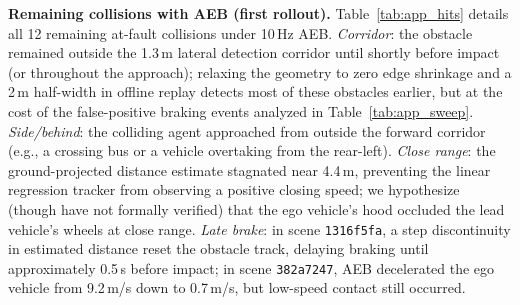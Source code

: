 \textbf{Remaining collisions with AEB (first rollout).} Table~\ref{tab:app_hits} details all 12 remaining at-fault collisions under 10\,Hz AEB. \emph{Corridor}: the obstacle remained outside the 1.3\,m lateral detection corridor until shortly before impact (or throughout the approach); relaxing the geometry to zero edge shrinkage and a 2\,m half-width in offline replay detects most of these obstacles earlier, but at the cost of the false-positive braking events analyzed in Table~\ref{tab:app_sweep}. \emph{Side/behind}: the colliding agent approached from outside the forward corridor (e.g., a crossing bus or a vehicle overtaking from the rear-left). \emph{Close range}: the ground-projected distance estimate stagnated near 4.4\,m, preventing the linear regression tracker from observing a positive closing speed; we hypothesize (though have not formally verified) that the ego vehicle's hood occluded the lead vehicle's wheels at close range. \emph{Late brake}: in scene \texttt{1316f5fa}, a step discontinuity in estimated distance reset the obstacle track, delaying braking until approximately 0.5\,s before impact; in scene \texttt{382a7247}, AEB decelerated the ego vehicle from 9.2\,m/s down to 0.7\,m/s, but low-speed contact still occurred.

